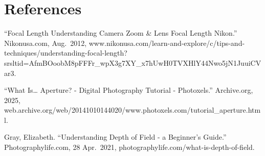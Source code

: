 \documentclass[10pt]{article}
\begin{document}
    
    
    

    \section{References}\label{references}

    ``Focal Length \textbar{} Understanding Camera Zoom \& Lens Focal Length
\textbar{} Nikon.'' Nikonusa.com, Aug.~2012,
www.nikonusa.com/learn-and-explore/c/tips-and-techniques/understanding-focal-length?srsltid=AfmBOoobM8pFFFr\_wpX3g7XY\_x7hUwH0TVXHlY44Nwo5jN1JuuiCVar3.

``What Is\ldots{} Aperture? - Digital Photography Tutorial -
Photoxels.'' Archive.org, 2025,
web.archive.org/web/20141010144020/www.photoxels.com/tutorial\_aperture.html.

Gray, Elizabeth. ``Understanding Depth of Field - a Beginner's Guide.''
Photographylife.com, 28 Apr.~2021,
photographylife.com/what-is-depth-of-field.


    
    
    
\end{document}
